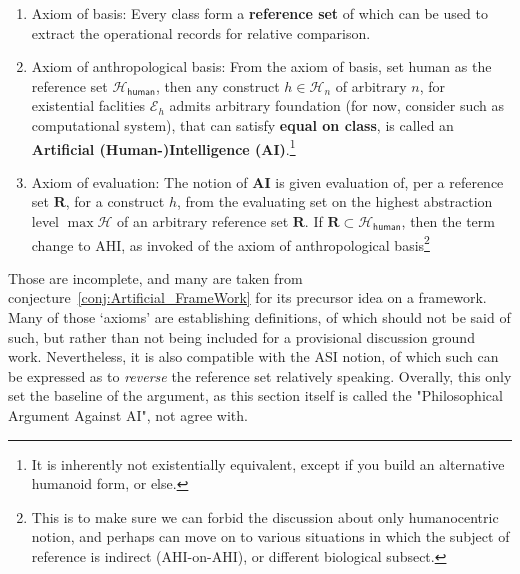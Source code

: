 \begin{note}
\begin{enumerate}
        \item Axiom of basis: Every class form a \textbf{reference set} of which can be used to extract the operational records for relative comparison. 
        \item Axiom of anthropological basis: From the axiom of basis, set human as the reference set $\mathcal{H}_{\mathsf{human}}$, then any construct $h\in \mathcal{H}_{n}$ of arbitrary $n$, for existential faclities $\mathcal{E}_{h}$ admits arbitrary foundation (for now, consider such as computational system), that can satisfy \textbf{equal on class}, is called an \textbf{Artificial (Human-)Intelligence (AI)}.\footnote{It is inherently not existentially equivalent, except if you build an alternative humanoid form, or else.}
        \item Axiom of evaluation: The notion of \textbf{AI} is given evaluation of, per a reference set $\mathbf{R}$, for a construct $h$, from the evaluating set on the highest abstraction level $\max \mathcal{H}$ of an arbitrary reference set $\mathbf{R}$. If $\mathbf{R}\subset \mathcal{H}_{\mathsf{human}}$, then the term change to AHI, as invoked of the axiom of anthropological basis\footnote{This is to make sure we can forbid the discussion about only humanocentric notion, and perhaps can move on to various situations in which the subject of reference is indirect (AHI-on-AHI), or different biological subsect.}
    \end{enumerate}
\end{note}

Those are incomplete, and many are taken from conjecture~\ref{conj:Artificial_FrameWork} for its precursor idea on a framework. Many of those `axioms' are establishing definitions, of which should not be said of such, but rather than not being included for a provisional discussion ground work. Nevertheless, it is also compatible with the ASI notion, of which such can be expressed as to \textit{reverse} the reference set relatively speaking. Overally, this only set the baseline of the argument, as this section itself is called the "Philosophical Argument Against AI", not agree with.  

